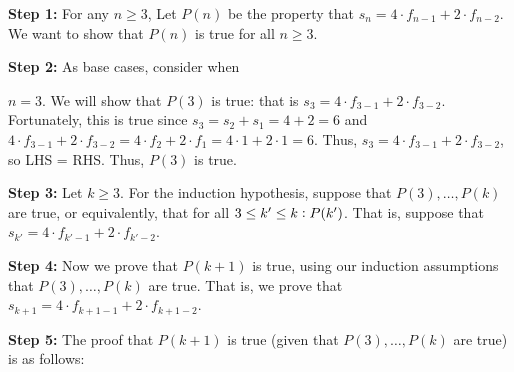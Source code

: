 \documentclass{article}
\begin{document}
\noindent\textbf{Step 1:} For any $n\geq 3$, Let $P(n)$ be the property that $s_n=4\cdot f_{n-1}+2\cdot f_{n-2}$.
\vspace{5pt}
We want to show that $P(n)$ is true for all $n\geq 3$.

\vspace{15pt}

\noindent\textbf{Step 2:} As base cases, consider when\vspace{10pt}

$n=3$. We will show that $P(3)$ is true: that is $s_3=4\cdot f_{3-1}+2\cdot f_{3-2}$. Fortunately, this is true since $s_3=s_2+s_1=4+2=6$ and $4\cdot f_{3-1}+2\cdot f_{3-2}=4\cdot f_2+2\cdot f_1=4\cdot 1+2\cdot 1=6$. Thus, $s_3=4\cdot f_{3-1}+2\cdot f_{3-2}$, so LHS = RHS. Thus, $P(3)$ is true.

\vspace{5pt}


\vspace{15pt}


\noindent\textbf{Step 3:} Let $k\geq 3$. For the induction hypothesis, suppose that $P(3),\ldots,P(k)$ are true, or equivalently, that for all $3\leq k'\leq k\vcentcolon P(k')$. That is, suppose that $s_{k'}=4\cdot f_{k'-1}+2\cdot f_{k'-2}$.
\vspace{15pt}

\noindent\textbf{Step 4:} Now we prove that $P(k+1)$ is true, using our induction assumptions that $P(3),\ldots,P(k)$ are true. That is, we prove that $s_{k+1}=4\cdot f_{k+1-1}+2\cdot f_{k+1-2}$.

\vspace{15pt}


\textbf{Step 5:} The proof that $P(k+1)$ is true (given that $P(3),\ldots,P(k)$ are true) is as follows:
\vspace{5pt}
\end{document}
